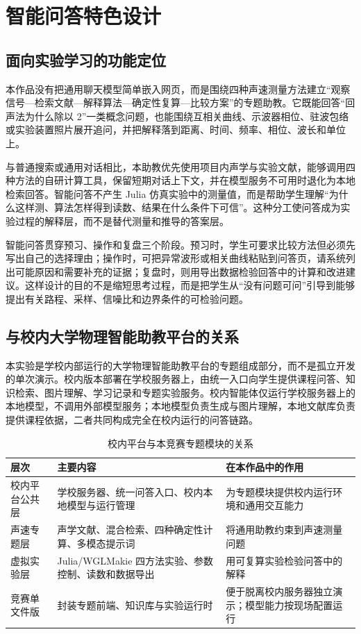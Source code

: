 \documentclass[UTF8,a4paper,zihao=-4]{ctexart}
\begin{document}
\section{智能问答特色设计}

\subsection{面向实验学习的功能定位}
本作品没有把通用聊天模型简单嵌入网页，而是围绕四种声速测量方法建立“观察信号—检索文献—解释算法—确定性复算—比较方案”的专题助教。它既能回答“回声法为什么除以 2”一类概念问题，也能围绕互相关曲线、示波器相位、驻波包络或实验装置照片展开追问，并把解释落到距离、时间、频率、相位、波长和单位上。

与普通搜索或通用对话相比，本助教优先使用项目内声学与实验文献，能够调用四种方法的自研计算工具，保留短期对话上下文，并在模型服务不可用时退化为本地检索回答。智能问答不产生 Julia 仿真实验中的测量值，而是帮助学生理解“为什么这样测、算法怎样得到读数、结果在什么条件下可信”。这种分工使问答成为实验过程的解释层，而不是替代测量和推导的答案层。

智能问答贯穿预习、操作和复盘三个阶段。预习时，学生可要求比较方法但必须先写出自己的选择理由；操作时，可把异常波形或相关曲线粘贴到问答页，请系统列出可能原因和需要补充的证据；复盘时，则用导出数据检验回答中的计算和改进建议。这样设计的目的不是缩短思考过程，而是把学生从“没有问题可问”引导到能够提出有关路程、采样、信噪比和边界条件的可检验问题。

\subsection{与校内大学物理智能助教平台的关系}
本实验是学校内部运行的大学物理智能助教平台的专题组成部分，而不是孤立开发的单次演示。校内版本部署在学校服务器上，由统一入口向学生提供课程问答、知识检索、图片理解、学习记录和专题实验服务。校内智能体仅运行学校服务器上的本地模型，不调用外部模型服务；本地模型负责生成与图片理解，本地文献库负责提供课程依据，二者共同构成完全在校内运行的问答链路。

\begin{table}[H]
\centering
\caption{校内平台与本竞赛专题模块的关系}
\begin{tabularx}{\textwidth}{p{3.0cm}X X}
\toprule
层次 & 主要内容 & 在本作品中的作用\\
\midrule
校内平台公共层 & 学校服务器、统一问答入口、校内本地模型与运行管理 & 为专题模块提供校内运行环境和通用交互能力\\
声速专题层 & 声学文献、混合检索、四种确定性计算、多模态提示词 & 将通用助教约束到声速测量问题\\
虚拟实验层 & Julia/WGLMakie 四方法实验、参数控制、读数和数据导出 & 用可复算实验检验问答中的解释\\
竞赛单文件版 & 封装专题前端、知识库与实验运行时 & 便于脱离校内服务器独立演示；模型能力按现场配置运行\\
\bottomrule
\end{tabularx}
\end{table}
\end{document}
